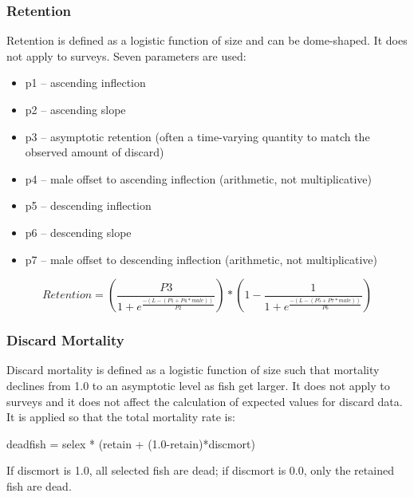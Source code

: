 
\subsubsection{Retention}
Retention is defined as a logistic function of size and can be dome-shaped.  It does not apply to surveys.  Seven parameters are used:
\begin{itemize}
	\item p1 – ascending inflection
	\item p2 – ascending slope
	\item p3 – asymptotic retention (often a time-varying quantity to match the observed amount of discard)
	\item p4 – male offset to ascending inflection (arithmetic, not multiplicative)
	\item p5 – descending inflection
	\item p6 – descending slope
	\item p7 – male offset to descending inflection (arithmetic, not multiplicative)
\end{itemize}
\begin{equation}
	Retention = \left(\frac{P3}{1 + e^{\frac{-(L-(P1+P4*male))}{P2}}}\right)*\left(1 - \frac{1}{1 + e^{\frac{-(L-(P5+P7*male))}{P6}}}\right)
\end{equation}

\subsubsection{Discard Mortality}
Discard mortality is defined as a logistic function of size such that mortality declines from 1.0 to an asymptotic level as fish get larger.  It does not apply to surveys and it does not affect the calculation of expected values for discard data.   It is applied so that the total mortality rate is:\\
\begin{center}
	deadfish = selex * (retain + (1.0-retain)*discmort)
\end{center}
If discmort is 1.0, all selected fish are dead; if discmort is 0.0, only the retained fish are dead.

